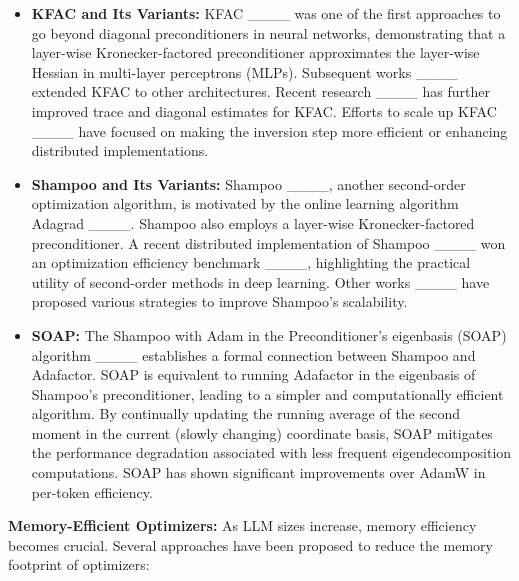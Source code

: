 \begin{itemize}
\item \textbf{KFAC and Its Variants:} KFAC ____ was one of the first approaches to go beyond diagonal preconditioners in neural networks, demonstrating that a layer-wise Kronecker-factored preconditioner approximates the layer-wise Hessian in multi-layer perceptrons (MLPs). Subsequent works ____ extended KFAC to other architectures. Recent research ____ has further improved trace and diagonal estimates for KFAC. Efforts to scale up KFAC ____ have focused on making the inversion step more efficient or enhancing distributed implementations.

\item \textbf{Shampoo and Its Variants:} Shampoo ____, another second-order optimization algorithm, is motivated by the online learning algorithm Adagrad ____. Shampoo also employs a layer-wise Kronecker-factored preconditioner. A recent distributed implementation of Shampoo ____ won an optimization efficiency benchmark ____, highlighting the practical utility of second-order methods in deep learning. Other works ____ have proposed various strategies to improve Shampoo's scalability.

\item \textbf{SOAP:} The Shampoo with Adam in the Preconditioner's eigenbasis (SOAP) algorithm ____ establishes a formal connection between Shampoo and Adafactor. SOAP is equivalent to running Adafactor in the eigenbasis of Shampoo's preconditioner, leading to a simpler and computationally efficient algorithm. By continually updating the running average of the second moment in the current (slowly changing) coordinate basis, SOAP mitigates the performance degradation associated with less frequent eigendecomposition computations. SOAP has shown significant improvements over AdamW in per-token efficiency.
\end{itemize}

\noindent\textbf{Memory-Efficient Optimizers:} As LLM sizes increase, memory efficiency becomes crucial. Several approaches have been proposed to reduce the memory footprint of optimizers:

